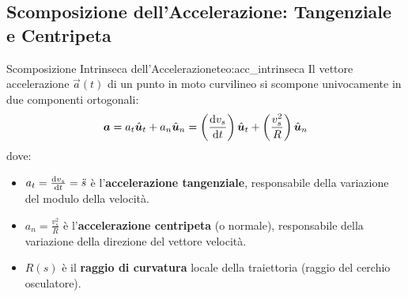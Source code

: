 \begin{center}
\end{center}

\subsection{Scomposizione dell'Accelerazione: Tangenziale e Centripeta}

\begin{teorema}{Scomposizione Intrinseca dell'Accelerazione}{teo:acc_intrinseca}
Il vettore accelerazione $\vec{a}(t)$ di un punto in moto curvilineo si scompone univocamente in due componenti ortogonali:
\begin{equation}
    \bm{a} = a_t \hat{\bm{u}}_t + a_n \hat{\bm{u}}_n = \left(\frac{\mathrm{d} v_s}{\mathrm{d} t}\right)\hat{\bm{u}}_t + \left(\frac{v_s^2}{R}\right)\hat{\bm{u}}_n
    \label{eq:scomposizione_acc}
\end{equation}
dove:
\begin{itemize}
    \item $a_t = \frac{\mathrm{d} v_s}{\mathrm{d} t} = \ddot{s}$ è l'\textbf{accelerazione tangenziale}, responsabile della variazione del modulo della velocità.
    \item $a_n = \frac{v_s^2}{R}$ è l'\textbf{accelerazione centripeta} (o normale), responsabile della variazione della direzione del vettore velocità.
    \item $R(s)$ è il \textbf{raggio di curvatura} locale della traiettoria (raggio del cerchio osculatore).
\end{itemize}
\end{teorema}

